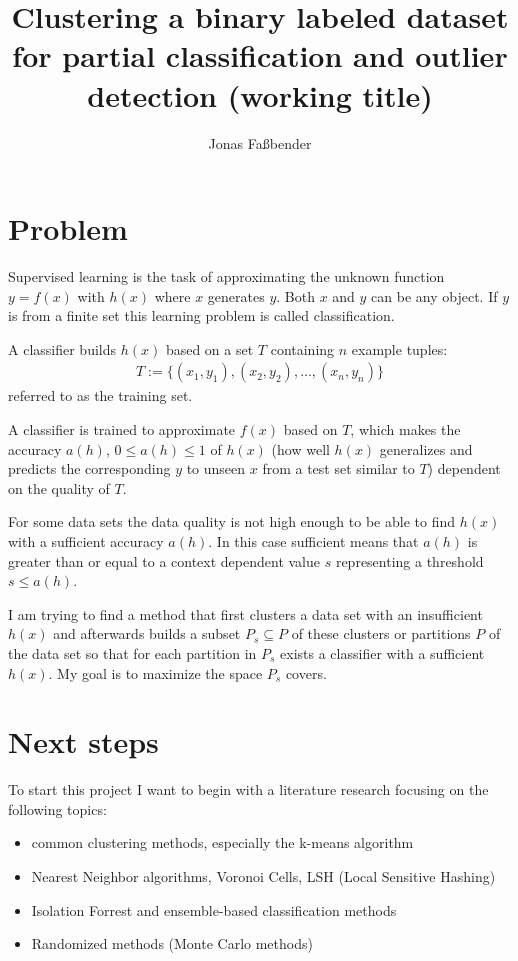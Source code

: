 \documentclass[12pt]{article}
\title{Clustering a binary labeled dataset for
  partial classification and outlier detection (working title)}
\author{Jonas Fa{\ss}bender}
\date{}
\begin{document}
\maketitle

\section{Problem}

Supervised learning is the task of approximating the
unknown function $y = f(x)$ with $h(x)$ where $x$ generates
$y$. Both $x$ and $y$ can be any object. If $y$ is from a
finite set this learning problem is called classification.

A classifier builds $h(x)$ based on a set $T$ containing
$n$ example tuples:
\begin{align*}
T := \{(x_1, y_1), (x_2, y_2), \dots ,(x_n,y_n)\}
\end{align*}
referred to as the training set.\cite{ki}

A classifier is trained to approximate $f(x)$ based on $T$,
which makes the accuracy $a(h)$, $0 \leq a(h) \leq 1$ of
$h(x)$ (how well $h(x)$ generalizes and predicts the
corresponding $y$ to unseen $x$ from a test set similar to
$T$) dependent on the quality of $T$.\cite{tc_data}

For some data sets the data quality is not high
enough to be able to find $h(x)$ with a sufficient
accuracy $a(h)$. In this case sufficient means that $a(h)$
is greater than or equal to a context dependent value $s$
representing a threshold $s \leq a(h)$.

I am trying to find a method that first clusters a data set
with an insufficient $h(x)$ and afterwards builds a subset
$P_s \subseteq P$ of these clusters or partitions $P$ of
the data set so that for each partition in $P_s$ exists a
classifier with a sufficient $h(x)$. My goal is to maximize
the space $P_s$ covers.

\section{Next steps}

To start this project I want to begin with a literature
research focusing on the following topics:

\begin{itemize}

  \item common clustering methods, especially the k-means
        algorithm

  \item Nearest Neighbor algorithms, Voronoi Cells, LSH
        (Local Sensitive Hashing)

  \item Isolation Forrest and ensemble-based classification
        methods

  \item Randomized methods (Monte Carlo methods)

\end{itemize}


\end{document}
